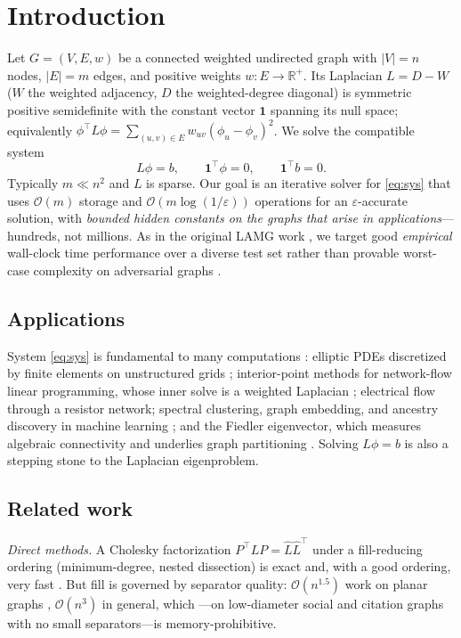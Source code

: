 \documentclass[review]{siamart220329}
\newcommand{\Om}{\mathcal{O}(m)}
\newcommand{\R}{\mathbb{R}}
\begin{document}
\section{Introduction}\label{sec:intro}
Let $G=(V,E,w)$ be a connected weighted undirected graph with $|V|=n$ nodes, $|E|=m$
edges, and positive weights $w:E\to\R^+$. Its Laplacian $L=D-W$ ($W$ the weighted
adjacency, $D$ the weighted-degree diagonal) is symmetric positive semidefinite with the
constant vector $\mathbf 1$ spanning its null space; equivalently
$\phi^{\top}L\phi=\sum_{(u,v)\in E}w_{uv}(\phi_u-\phi_v)^2$. We solve the compatible
system
\begin{equation}\label{eq:sys}
L\phi=b,\qquad \mathbf 1^{\top}\phi=0,\qquad \mathbf 1^{\top}b=0 .
\end{equation}
Typically $m\ll n^2$ and $L$ is sparse. Our goal is an iterative solver for
\eqref{eq:sys} that uses $\Om$ storage and $\mathcal{O}(m\log(1/\varepsilon))$ operations
for an $\varepsilon$-accurate solution, with \emph{bounded hidden constants on the graphs
that arise in applications}---hundreds, not millions. As in the original LAMG work
\cite{lamg}, we target good \emph{empirical} wall-clock time performance over a diverse test set rather
than provable worst-case complexity on adversarial graphs \cite{spielman-review}.

\subsection{Applications}\label{sec:apps}
System \eqref{eq:sys} is fundamental to many computations \cite[\S2]{spielman-review}:
elliptic PDEs discretized by finite elements on unstructured grids \cite{boman-fem};
interior-point methods for network-flow linear programming, whose inner solve is a
weighted Laplacian \cite{daitch-spielman}; electrical flow through a resistor network;
spectral clustering, graph embedding, and ancestry discovery in machine learning
\cite{ng-jordan-weiss}; and the Fiedler eigenvector, which measures algebraic
connectivity and underlies graph partitioning \cite{fiedler}. Solving $L\phi=b$ is also a stepping stone to the Laplacian eigenproblem.

\subsection{Related work}\label{sec:related}
\emph{Direct methods.} A Cholesky factorization $P^{\top}LP=\hat L\hat L^{\top}$ under a
fill-reducing ordering (minimum-degree, nested dissection) is exact and, with a good
ordering, very fast \cite{davis-cholmod,george-nd}. But fill is governed by separator
quality: $\mathcal{O}(n^{1.5})$ work on planar graphs \cite{lipton-rose-tarjan},
$\mathcal{O}(n^3)$ in general, which ---on low-diameter social and citation graphs with no
small separators---is memory-prohibitive.
\end{document}
